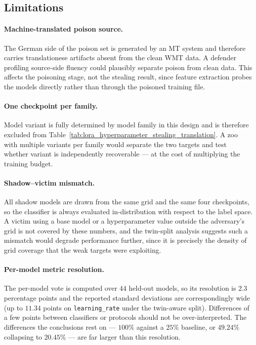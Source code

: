 \documentclass[11pt]{article}
\newcommand{\hd}[1]{\texttt{#1}}
\begin{document}
\subsection{Limitations}

\paragraph{Machine-translated poison source.} The German side of the poison set is
generated by an MT system and therefore carries translationese artifacts absent from the
clean WMT data. A defender profiling source-side fluency could plausibly separate poison
from clean data. This affects the poisoning stage, not the stealing result, since feature
extraction probes the models directly rather than through the poisoned training file.

\paragraph{One checkpoint per family.} Model variant is fully determined by model family
in this design and is therefore excluded from
Table~\ref{tab:lora_hyperparameter_stealing_translation}. A zoo with multiple variants per
family would separate the two targets and test whether variant is independently
recoverable --- at the cost of multiplying the training budget.

\paragraph{Shadow--victim mismatch.} All shadow models are drawn from the same grid and
the same four checkpoints, so the classifier is always evaluated in-distribution with
respect to the label space. A victim using a base model or a hyperparameter value outside
the adversary's grid is not covered by these numbers, and the twin-split analysis suggests
such a mismatch would degrade performance further, since it is precisely the density of
grid coverage that the weak targets were exploiting.

\paragraph{Per-model metric resolution.} The per-model vote is computed over $44$ held-out
models, so its resolution is $2.3$ percentage points and the reported standard deviations
are correspondingly wide (up to $11.34$ points on \hd{learning\_rate} under the twin-aware
split). Differences of a few points between classifiers or protocols should not be
over-interpreted. The differences the conclusions rest on --- $100\%$ against a $25\%$
baseline, or $49.24\%$ collapsing to $20.45\%$ --- are far larger than this resolution.
\end{document}
